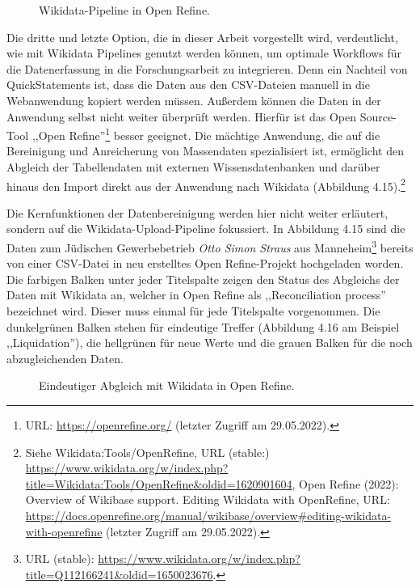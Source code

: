 \begin{figure}[h]
    \centering
    \caption{Wikidata-Pipeline in Open Refine.}
    \label{fig:x cubed graph}
\end{figure}

Die dritte und letzte Option, die in dieser Arbeit vorgestellt wird, verdeutlicht, wie mit Wikidata Pipelines genutzt werden können, um optimale Workflows für die Datenerfassung in die Forschungsarbeit zu integrieren. Denn ein Nachteil von QuickStatements ist, dass die Daten aus den CSV-Dateien manuell in die Webanwendung kopiert werden müssen. Außerdem können die Daten in der Anwendung selbst nicht weiter überprüft werden. Hierfür ist das Open Source-Tool ,,Open Refine''\footnote{URL: \url{https://openrefine.org/} (letzter Zugriff am 29.05.2022).} besser geeignet. Die mächtige Anwendung, die auf die Bereinigung und Anreicherung von Massendaten spezialisiert ist, ermöglicht den Abgleich der Tabellendaten mit externen Wissensdatenbanken und darüber hinaus den Import direkt aus der Anwendung nach Wikidata (Abbildung 4.15).\footnote{Siehe Wikidata:Tools/OpenRefine, URL (stable:) \url{https://www.wikidata.org/w/index.php?title=Wikidata:Tools/OpenRefine\&oldid=1620901604}, Open Refine (2022): Overview of Wikibase support. Editing Wikidata with OpenRefine, URL: \url{https://docs.openrefine.org/manual/wikibase/overview\#editing-wikidata-with-openrefine} (letzter Zugriff am 29.05.2022).}

Die Kernfunktionen der Datenbereinigung werden hier nicht weiter erläutert, sondern auf die Wikidata-Upload-Pipeline fokussiert. In Abbildung 4.15 sind die Daten zum Jüdischen Gewerbebetrieb \textit{Otto Simon Straus} aus Manneheim\footnote{URL (stable): \url{https://www.wikidata.org/w/index.php?title=Q112166241\&oldid=1650023676}.} bereits von einer CSV-Datei in neu erstelltes Open Refine-Projekt hochgeladen worden. Die farbigen Balken unter jeder Titelspalte zeigen den Status des Abgleichs der Daten mit Wikidata an, welcher in Open Refine als ,,Reconciliation process'' bezeichnet wird. Dieser muss einmal für jede Titelspalte vorgenommen. Die dunkelgrünen Balken stehen für eindeutige Treffer (Abbildung 4.16 am Beispiel ,,Liquidation''), die hellgrünen für neue Werte und die grauen Balken für die noch abzugleichenden Daten. 

\begin{figure}[h]
    \centering
    \caption{Eindeutiger Abgleich mit Wikidata in Open Refine.}
    \label{fig:x cubed graph}
\end{figure}

